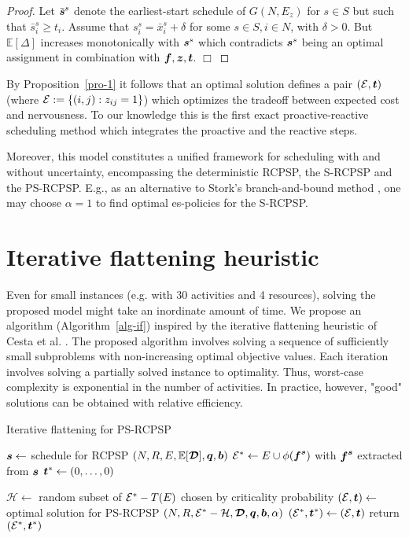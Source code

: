  	\begin{proof}
 	Let $\bar{\boldsymbol{s}}^s$ denote the earliest-start schedule of $G(N,E_z)$ for $s\in S$ but
 	such that $\bar{s}^s_i \geq t_i$.
 	Assume that $s^s_i = \bar{x}^s_i + \delta$ for some $s \in S, i \in N$, with $\delta > 0$.
 	But $\mathbb{E}[\Delta]$ increases monotonically with $\boldsymbol{s}^s$
 	which contradicts  $\boldsymbol{s}^s$ being an optimal assignment
 	in combination with $\boldsymbol{f}, \boldsymbol{z}, \boldsymbol{t}$.
 	\hfill $\Box$
 	\end{proof}
	
	By Proposition~\ref{pro-1} it follows that
	an optimal solution defines a pair $(\mathcal{E},\boldsymbol{t})$ (where $\mathcal{E} := \{(i,j) : z_{ij}=1\}$)
	which optimizes the tradeoff between expected cost and nervousness.
	To our knowledge this is the first exact proactive-reactive scheduling method 
	which integrates the proactive and the reactive steps.
	
	Moreover, this model constitutes a unified framework for
	scheduling with and without uncertainty,
	encompassing the deterministic RCPSP, the S-RCPSP and the PS-RCPSP.
	E.g., as an alternative to Stork's branch-and-bound method \cite{stork2000branch},
	one may choose $\alpha = 1$ to find optimal es-policies for the S-RCPSP.
 	
	\section{Iterative flattening heuristic}
 	\label{sec-heur}
 	
 	Even for small instances (e.g. with 30 activities and 4 resources),
 	solving the proposed model might take an inordinate amount of time.
 	We propose an algorithm (Algorithm~\ref{alg-if})
 	inspired by the iterative flattening heuristic of Cesta et al. \cite{}.
 	The proposed algorithm involves solving a sequence of 
 	sufficiently small subproblems with non-increasing optimal objective values.
 	Each iteration involves solving a partially solved instance to optimality.
 	Thus, worst-case complexity is exponential in the number of activities.
 	In practice, however, "good" solutions can be obtained with relative efficiency.
  	
 	\begin{algorithm}
 		\caption{Iterative flattening for PS-RCPSP}
 		\label{alg-if}
 		\begin{algorithmic}[1]
 		\STATE $\boldsymbol{s} \leftarrow$ schedule for RCPSP $(N,R,E,\mathbb{E}[\boldsymbol{\mathcal{D}}],\boldsymbol{q},\boldsymbol{b})$
 		\STATE $\mathcal{E}^{*} \leftarrow E \cup \phi(\boldsymbol{f}^{\boldsymbol{s}})$ with $\boldsymbol{f}^{\boldsymbol{s}}$ extracted from $\boldsymbol{s}$
 		\STATE $\boldsymbol{t}^{*} \leftarrow (0,\ldots,0)$
 		
 			\STATE $\mathcal{H} \leftarrow$ random subset of $\mathcal{E}^{*}-T(E)$ chosen by criticality probability
 			\STATE $(\mathcal{E},\boldsymbol{t}) \leftarrow$ 
 					optimal solution for PS-RCPSP $(N,R,\mathcal{E}^{*}-\mathcal{H},\boldsymbol{\mathcal{D}},\boldsymbol{q},\boldsymbol{b},\alpha)$
 				\STATE $(\mathcal{E}^{*},\boldsymbol{t}^{*}) \leftarrow (\mathcal{E},\boldsymbol{t})$
  			\ENDIF
 		\ENDWHILE
 		\STATE return $(\mathcal{E}^{*},\boldsymbol{t}^{*})$
 		\end{algorithmic}
 	\end{algorithm}	
 	
